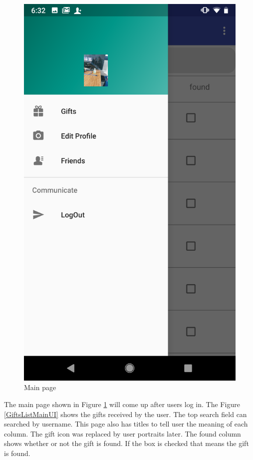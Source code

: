 \begin{figure}[htb]
\begin{minipage}[t]{0.5\textwidth}
\includegraphics[width=.95\textwidth]{section03/assets/MainPortrait.png}
\subcaption{\label{FunctionsMainUI}}
\end{minipage}%
\caption[Short Caption 2]{\label{MainPageUI}Main page}
\end{figure}
\par The main page shown in Figure \ref{MainPageUI} will come up after users log in. The Figure \ref{GiftsListMainUI} shows the gifts received by the user. The top search field can searched by username. This page also has titles to tell user the meaning of each column. The gift icon was replaced by user portraits later. The found column shows whether or not the gift is found. If the box is checked that means the gift is found.
